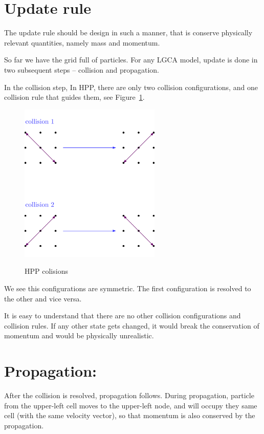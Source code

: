 \section{Update rule}
The update rule should be design in such a manner, that is conserve physically relevant quantities, namely mass and momentum.

So far we have the grid full of particles.
For any LGCA model, update is done in two subsequent steps -- collision and propagation.

In the collision step, In HPP, there are only two collision configurations, and one collision rule that guides them, see Figure~\ref{hpp-colision}.

\begin{figure}
 \centering
 \includegraphics[width=0.6\textwidth]{./img/hpp_col}
 \label{hpp-colision}
 \caption{HPP colisions}
\end{figure}

We see this configurations are symmetric. The first configuration is resolved to the other and vice versa.

It is easy to understand that there are no other collision configurations and collision rules. If any other state gets changed, it would break the conservation of momentum and would be physically unrealistic.

\section{Propagation:}

After the collision is resolved, propagation follows.
During propagation, particle from the upper-left cell moves to the upper-left node, and will occupy they same cell (with the same velocity vector), so that momentum is also conserved by the propagation.

